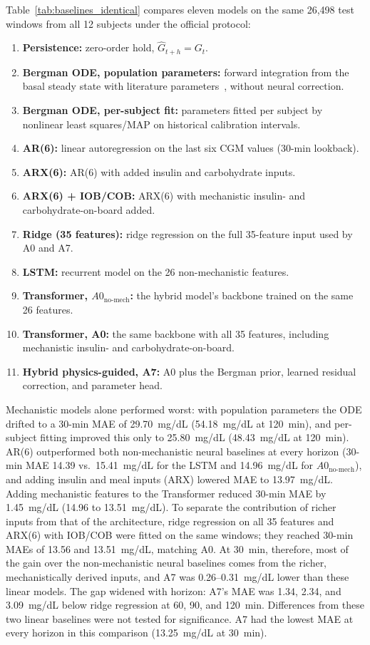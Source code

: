 \documentclass[journal]{IEEEtran}
\begin{document}
Table~\ref{tab:baselines_identical} compares eleven models on the same 26,498 test windows from all 12 subjects under the official protocol:
\begin{enumerate}
    \item \textbf{Persistence:} zero-order hold, $\hat{G}_{t+h} = G_t$.
    \item \textbf{Bergman ODE, population parameters:} forward integration from the basal steady state with literature parameters~\cite{ref1,ref32}, without neural correction.
    \item \textbf{Bergman ODE, per-subject fit:} parameters fitted per subject by nonlinear least squares/MAP on historical calibration intervals.
    \item \textbf{AR(6):} linear autoregression on the last six CGM values (30-min lookback).
    \item \textbf{ARX(6):} AR(6) with added insulin and carbohydrate inputs.
    \item \textbf{ARX(6) + IOB/COB:} ARX(6) with mechanistic insulin- and carbohydrate-on-board added.
    \item \textbf{Ridge (35 features):} ridge regression on the full 35-feature input used by A0 and A7.
    \item \textbf{LSTM:} recurrent model on the 26 non-mechanistic features.
    \item \textbf{Transformer, $A0_{\text{no-mech}}$:} the hybrid model's backbone trained on the same 26 features.
    \item \textbf{Transformer, A0:} the same backbone with all 35 features, including mechanistic insulin- and carbohydrate-on-board.
    \item \textbf{Hybrid physics-guided, A7:} A0 plus the Bergman prior, learned residual correction, and parameter head.
\end{enumerate}

Mechanistic models alone performed worst: with population parameters the ODE drifted to a 30-min MAE of 29.70~mg/dL (54.18~mg/dL at 120~min), and per-subject fitting improved this only to 25.80~mg/dL (48.43~mg/dL at 120~min). AR(6) outperformed both non-mechanistic neural baselines at every horizon (30-min MAE 14.39 vs.\ 15.41~mg/dL for the LSTM and 14.96~mg/dL for $A0_{\text{no-mech}}$), and adding insulin and meal inputs (ARX) lowered MAE to 13.97~mg/dL. Adding mechanistic features to the Transformer reduced 30-min MAE by 1.45~mg/dL (14.96 to 13.51~mg/dL). To separate the contribution of richer inputs from that of the architecture, ridge regression on all 35 features and ARX(6) with IOB/COB were fitted on the same windows; they reached 30-min MAEs of 13.56 and 13.51~mg/dL, matching A0. At 30~min, therefore, most of the gain over the non-mechanistic neural baselines comes from the richer, mechanistically derived inputs, and A7 was 0.26--0.31~mg/dL lower than these linear models. The gap widened with horizon: A7's MAE was 1.34, 2.34, and 3.09~mg/dL below ridge regression at 60, 90, and 120~min. Differences from these two linear baselines were not tested for significance. A7 had the lowest MAE at every horizon in this comparison (13.25~mg/dL at 30~min).
\end{document}
